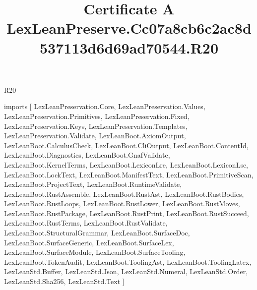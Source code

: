 \begin{lexlean}{R20}
\title{Certificate A LexLeanPreserve.Cc07a8cb6c2ac8d537113d6d69ad70544.R20}
\begin{coremodule}
imports [
  LexLeanPreservation.Core,
  LexLeanPreservation.Values,
  LexLeanPreservation.Primitives,
  LexLeanPreservation.Fixed,
  LexLeanPreservation.Keys,
  LexLeanPreservation.Templates,
  LexLeanPreservation.Validate,
  LexLeanBoot.AxiomOutput,
  LexLeanBoot.CalculusCheck,
  LexLeanBoot.CliOutput,
  LexLeanBoot.ContentId,
  LexLeanBoot.Diagnostics,
  LexLeanBoot.GnafValidate,
  LexLeanBoot.KernelTerms,
  LexLeanBoot.LexiconLre,
  LexLeanBoot.LexiconLse,
  LexLeanBoot.LockText,
  LexLeanBoot.ManifestText,
  LexLeanBoot.PrimitiveScan,
  LexLeanBoot.ProjectText,
  LexLeanBoot.RuntimeValidate,
  LexLeanBoot.RustAssemble,
  LexLeanBoot.RustAst,
  LexLeanBoot.RustBodies,
  LexLeanBoot.RustLoops,
  LexLeanBoot.RustLower,
  LexLeanBoot.RustMoves,
  LexLeanBoot.RustPackage,
  LexLeanBoot.RustPrint,
  LexLeanBoot.RustSucceed,
  LexLeanBoot.RustTerms,
  LexLeanBoot.RustValidate,
  LexLeanBoot.StructuralGrammar,
  LexLeanBoot.SurfaceDoc,
  LexLeanBoot.SurfaceGeneric,
  LexLeanBoot.SurfaceLex,
  LexLeanBoot.SurfaceModule,
  LexLeanBoot.SurfaceTooling,
  LexLeanBoot.TokenAudit,
  LexLeanBoot.ToolingAst,
  LexLeanBoot.ToolingLatex,
  LexLeanStd.Buffer,
  LexLeanStd.Json,
  LexLeanStd.Numeral,
  LexLeanStd.Order,
  LexLeanStd.Sha256,
  LexLeanStd.Text
]


\end{coremodule}
\end{lexlean}
